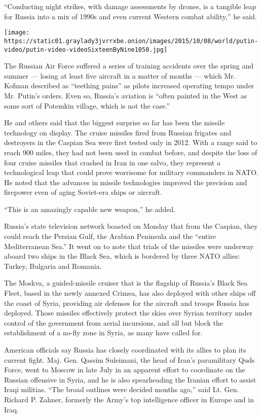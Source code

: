 ``Conducting night strikes, with damage assessments by drones, is a
tangible leap for Russia into a mix of 1990s and even current Western
combat ability,'' he said.

\texttt{[image: https://static01.graylady3jvrrxbe.onion/images/2015/10/08/world/putin-video/putin-video-videoSixteenByNine1050.jpg]}

The Russian Air Force suffered a series of training accidents over the
spring and summer --- losing at least five aircraft in a matter of
months --- which Mr. Kofman described as ``teething pains'' as pilots
increased operating tempo under Mr. Putin's orders. Even so, Russia's
aviation is ``often painted in the West as some sort of Potemkin
village, which is not the case.''

He and others said that the biggest surprise so far has been the missile
technology on display. The cruise missiles fired from Russian frigates
and destroyers in the Caspian Sea were first tested only in 2012. With a
range said to reach 900 miles, they had not been used in combat before,
and despite the loss of four cruise missiles that crashed in Iran in one
salvo, they represent a technological leap that could prove worrisome
for military commanders in NATO. He noted that the advances in missile
technologies improved the precision and firepower even of aging
Soviet-era ships or aircraft.

``This is an amazingly capable new weapon,'' he added.

Russia's state television network boasted on Monday that from the
Caspian, they could reach the Persian Gulf, the Arabian Peninsula and
the ``entire Mediterranean Sea.'' It went on to note that trials of the
missiles were underway aboard two ships in the Black Sea, which is
bordered by three NATO allies: Turkey, Bulgaria and Romania.

The Moskva, a guided-missile cruiser that is the flagship of Russia's
Black Sea Fleet, based in the newly annexed Crimea, has also deployed
with other ships off the coast of Syria, providing air defenses for the
aircraft and troops Russia has deployed. Those missiles effectively
protect the skies over Syrian territory under control of the government
from aerial incursions, and all but block the establishment of a no-fly
zone in Syria, as many have called for.

American officials say Russia has closely coordinated with its allies to
plan its current fight. Maj. Gen. Qassim Suleimani, the head of Iran's
paramilitary Quds Force, went to Moscow in late July in an apparent
effort to coordinate on the Russian offensive in Syria, and he is also
spearheading the Iranian effort to assist Iraqi militias. ``The broad
outlines were decided months ago,'' said Lt. Gen. Richard P. Zahner,
formerly the Army's top intelligence officer in Europe and in Iraq.

